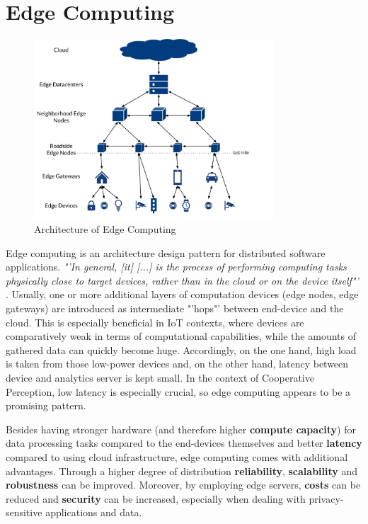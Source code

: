 \section{Edge Computing}
\label{sec:background:edge_computing}

\begin{figure}
	\centering
	\includegraphics[width=0.8\textwidth]{98_images/edge.png}
	\caption[Architecture of Edge Computing]{Architecture of Edge Computing \cite{Bischoff2019}}
	\label{fig:edge_computing}
\end{figure}

Edge computing is an architecture design pattern for distributed software applications. \textit{"'In general, [it] [...] is the process of performing computing tasks physically close to target devices, rather than in the cloud or on the device itself"'} \cite{Bischoff2019}. Usually, one or more additional layers of computation devices (edge nodes, edge gateways) are introduced as intermediate "'hops"' between end-device and the cloud. This is especially beneficial in IoT contexts, where devices are comparatively weak in terms of computational capabilities, while the amounts of gathered data can quickly become huge. Accordingly, on the one hand, high load is taken from those low-power devices and, on the other hand, latency between device and analytics server is kept small. In the context of Cooperative Perception, low latency is especially crucial, so edge computing appears to be a promising pattern.

Besides having stronger hardware (and therefore higher \textbf{compute capacity}) for data processing tasks compared to the end-devices themselves and better \textbf{latency} compared to using cloud infrastructure, edge computing comes with additional advantages. Through a higher degree of distribution \textbf{reliability}, \textbf{scalability} and \textbf{robustness} can be improved. Moreover, by employing edge servers, \textbf{costs} can be reduced and \textbf{security} can be increased, especially when dealing with privacy-sensitive applications and data. 

